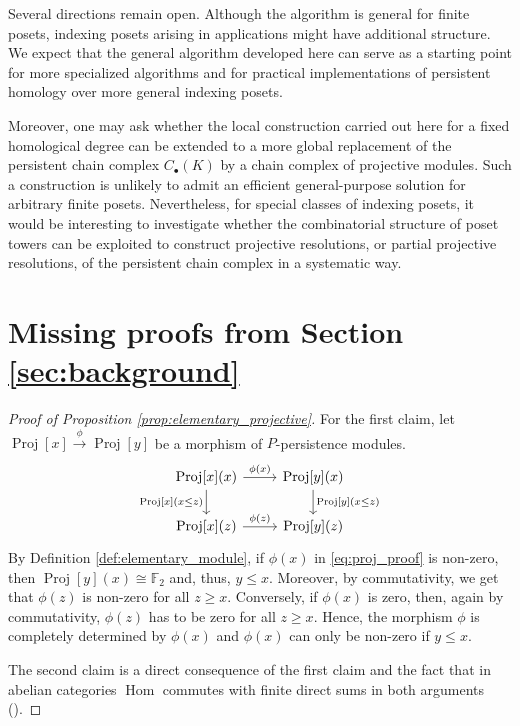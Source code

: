 \documentclass[english,a4paper,nolineno,cleveref]{socg-lipics-v2021}
\DeclareMathOperator{\Hom}{Hom}
\DeclareMathOperator{\proj}{Proj}
\begin{document}
Several directions remain open. Although the algorithm is general for finite posets, indexing
posets arising in applications might have additional structure. We expect that 
the general algorithm developed here can serve as a starting point for more specialized algorithms
and for practical implementations of persistent homology over more general
indexing posets. 

Moreover, one may ask whether the local construction carried out here for a
fixed homological degree can be extended to a more global replacement of the
persistent chain complex $C_\bullet(K)$ by a chain complex of projective
modules. Such a construction is unlikely to admit an efficient
general-purpose solution for arbitrary finite posets. Nevertheless, for
special classes of indexing posets, it would be interesting to investigate
whether the combinatorial structure of poset towers can be exploited to
construct projective resolutions, or partial projective resolutions, of the
persistent chain complex in a systematic way.
  





\appendix

\section{Missing proofs from Section \ref{sec:background}} \label{app:proofs_sec_background}

\begin{proof}[Proof of Proposition \ref{prop:elementary_projective}]
For the first claim, let $\proj[x]\xrightarrow{\phi}\proj[y]$ be a morphism of $P$-persistence modules. 
\begin{equation} \label{eq:proj_proof}
\begin{tikzcd}
\proj[x](x) \arrow[r,"\phi(x)"] \arrow[d,swap,"\proj\!\text{[}x\text{]}(x\leq z)"] & \proj[y](x) \arrow[d,"\proj\!\text{[}y\text{]}(x\leq z)"] \\
\proj[x](z) \arrow[r,"\phi(z)"] & \proj[y](z)
\end{tikzcd}
\end{equation}
By Definition \ref{def:elementary_module}, if $\phi(x)$ in \eqref{eq:proj_proof} is non-zero, then $\proj[y](x)\cong \mathbb{F}_2$ and, thus, $y\leq x$. Moreover, by commutativity, we get that $\phi(z)$ is non-zero for all $z\geq x$. Conversely, if $\phi(x)$ is zero, then, again by commutativity, $\phi(z)$ has to be zero for all $z\geq x$. Hence, the morphism $\phi$ is completely determined by $\phi(x)$ and $\phi(x)$ can only be non-zero if $y\leq x$.

The second claim is a direct consequence of the first claim and the fact that in abelian categories $\Hom$ commutes with finite direct sums in both arguments (\cite{maclane}).
\end{proof}
\end{document}
